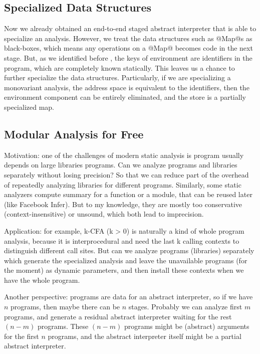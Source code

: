 \subsection{Specialized Data Structures}

Now we already obtained an end-to-end staged abstract interpreter that is able to 
specialize an analysis. However, we treat the data structures such as @Map@s as black-boxes,
which means any operations on a @Map@ becomes code in the next stage.
But, as we identified before , the keys of environment are identifiers in the program,
which are completely known statically. This leaves us a chance to further specialize the 
data structures. Particularly, if we are specializing a monovariant analysis, the address space 
is equivalent to the identifiers, then the environment component can be entirely eliminated, 
and the store is a partially specialized map.

\subsection{Modular Analysis for Free}

Motivation: one of the challenges of modern static analysis is program usually depends on
large libraries programs\cite{toman_et_al:LIPIcs:2017:7121}. 
Can we analyze programs and libraries separately without losing precision? So that we can 
reduce part of the overhead of repeatedly analyzing libraries for different programs.
Similarly, some static analyzers compute summary for a function or a module, that can be reused
later (like Facebook Infer). But to my knowledge, they are mostly too conservative (context-insensitive) 
or unsound, which both lead to imprecision.

Application: for example, k-CFA (k > 0) is naturally a kind of whole program analysis,
because it is interprocedural and need the last k calling contexts to distinguish
different call sites.
But can we analyze programs (libraries) separately which generate the specialized 
analysis and leave the unavailable programs (for the moment) as dynamic parameters, 
and then install these contexts when we have the whole program.

Another perspective: programs are data for an abstract interpreter, so if we have $n$ programs, 
then maybe there can be $n$ stages. 
Probably we can analyze first $m$ programs, and generate a residual abstract interpreter
waiting for the rest $(n-m)$ programs.
These $(n-m)$ programs might be (abstract) arguments for the first $n$ programs, and
the abstract interpreter itself might be a partial abstract interpreter.

